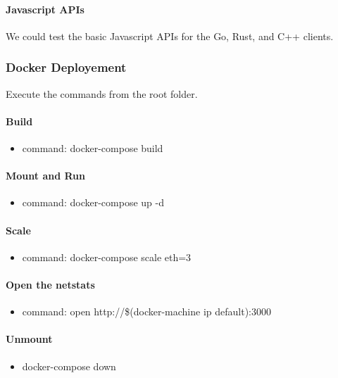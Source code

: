 \paragraph{Javascript APIs} We could test the basic Javascript APIs for the Go, Rust, and C++ clients.

\subsubsection{Docker Deployement} Execute the commands from the root folder.

\paragraph{Build}
\begin{itemize}
\item command: docker-compose build
\end{itemize}

\paragraph{Mount and Run}
\begin{itemize}
\item command: docker-compose up -d
\end{itemize}

\paragraph{Scale}
\begin{itemize}
\item command: docker-compose scale eth=3
\end{itemize}

\paragraph{Open the netstats}
\begin{itemize}
\item command: open http://\$(docker-machine ip default):3000
\end{itemize}

\paragraph{Unmount} 
\begin{itemize}
\item docker-compose down
\end{itemize}


